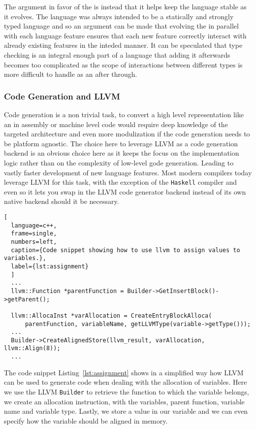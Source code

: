 The argument in favor of the \typeChecker{} is instead that it helps keep the
language stable as it evolves. The language was always intended to be a statically
and strongly typed language and so an argument can be made that evolving the
\typeChecker{} in parallel with each language feature ensures that each new feature
correctly interact with already existing features in the inteded manner. It can be
speculated that type checking is an integral enough part of a language that adding it
afterwards becomes too complicated as the scope of interactions between different
types is more difficult to handle as an after through. \\ 



\subsubsection{Code Generation and LLVM}

Code generation is a non trivial task, to convert a high level representation like an
\ast{} in assembly or machine level code would require deep knowledge of the targeted
architecture and even more modulization if the code generation needs to be platform
agnostic. The choice here to leverage LLVM as a code generation backend is an
obvious choice here as it keeps the focus on the implementation logic rather than on
the complexity of low-level gode generation. Leading to vastly faster development of
new language features. Most modern compilers today leverage LLVM for this task, with
the exception of the \texttt{Haskell} compiler and even so it lets you swap in the
LLVM code generator backend instead of its own native backend should it be necessary.

\begin{lstlisting}[
  language=c++,
  frame=single,
  numbers=left,
  caption={Code snippet showing how to use llvm to assign values to variables.},
  label={lst:assignment}
  ]
  ...
  llvm::Function *parentFunction = Builder->GetInsertBlock()->getParent();

  llvm::AllocaInst *varAllocation = CreateEntryBlockAlloca(
      parentFunction, variableName, getLLVMType(variable->getType()));
  ...
  Builder->CreateAlignedStore(llvm_result, varAllocation, llvm::Align(8));
  ...
\end{lstlisting}

The code snippet Listing~\ref{lst:assignment} shows in a simplified way how LLVM can
be used to generate code when dealing with the allocation of variables.
Here we use the LLVM \texttt{Builder} to retrieve the function to which the variable
belongs, we create an allocation instruction, with the variables, parent function,
variable name and variable type. Lastly, we store a value in our variable and we can
even specify how the variable should be aligned in memory.\\

